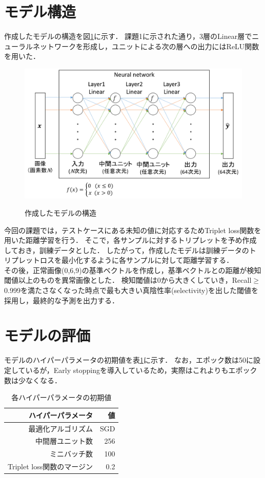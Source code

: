 \documentclass[10pt]{jarticle}
\begin{document}
\section{モデル構造}
作成したモデルの構造を図\ref{nn}に示す．
課題1に示された通り，3層のLinear層でニューラルネットワークを形成し，ユニットによる次の層への出力にはReLU関数を用いた．

\begin{figure}[H]
  \centering
  \includegraphics[width=12cm]{nn.png}
  \label{nn}
  \caption{作成したモデルの構造}
\end{figure}

今回の課題では，テストケースにある未知の値に対応するためTriplet loss関数を用いた距離学習を行う．
そこで，各サンプルに対するトリプレットを予め作成しておき，訓練データとした．
したがって，作成したモデルは訓練データのトリプレットロスを最小化するように各サンプルに対して距離学習する．\\
\quad その後，正常画像(0,6,9)の基準ベクトルを作成し，基準ベクトルとの距離が検知閾値以上のものを異常画像とした．
検知閾値は0から大きくしていき，Recall$\ge $0.999を満たさなくなった時点で最も大きい真陰性率(selectivity)を出した閾値を採用し，最終的な予測を出力する．

\section{モデルの評価}
モデルのハイパーパラメータの初期値を表\ref{1stparams}に示す．
なお，エポック数は50に設定しているが，Early stoppingを導入しているため，実際はこれよりもエポック数は少なくなる．

\begin{table}[H]
\caption{各ハイパーパラメータの初期値}
\label{1stparams}
\centering
\begin{tabular}{rr} \hline
ハイパーパラメータ & 値 \\ \hline
最適化アルゴリズム & SGD \\
中間層ユニット数 & 256 \\
ミニバッチ数 & 100 \\
Triplet loss関数のマージン & 0.2 \\ \hline
\end{tabular}
\end{table}
\end{document}
